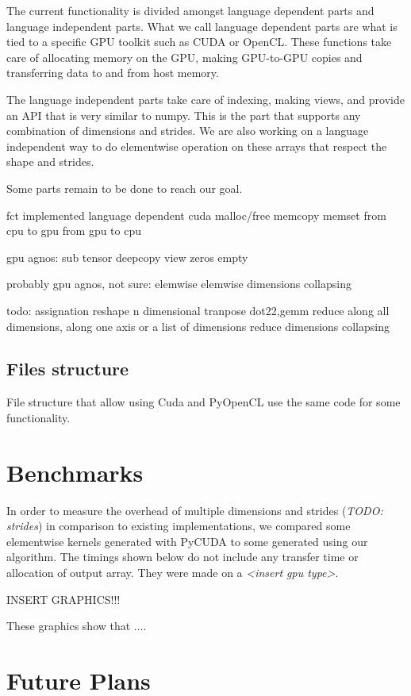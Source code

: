 \documentclass{article} %
\begin{document}
The current functionality is divided amongst language dependent parts and language independent parts.  What we call language dependent parts are what is tied to a specific GPU toolkit such as CUDA or OpenCL.  These functions take care of allocating memory on the GPU, making GPU-to-GPU copies and transferring data to and from host memory.  

The language independent parts take care of indexing, making views, and provide an API that is very similar to numpy.  This is the part that supports any combination of dimensions and strides.  We are also working on a language independent way to do elementwise operation on these arrays that respect the shape and strides.

Some parts remain to be done to reach our goal.

fct implemented language dependent
cuda
malloc/free
memcopy
memset
from cpu to gpu
from gpu to cpu

gpu agnos:
sub tensor
deepcopy
view
zeros
empty

probably gpu agnos, not sure:
elemwise
elemwise dimensions collapsing


todo:
assignation
reshape
n dimensional tranpose
dot22,gemm
reduce along all dimensions, along one axis or a list of dimensions
reduce dimensions collapsing

\subsection{Files structure}
File structure that allow using Cuda and PyOpenCL use the same code for some functionality.

\section{Benchmarks}

In order to measure the overhead of multiple dimensions and strides (\emph{TODO: strides}) in comparison to existing implementations, we compared some elementwise kernels generated with PyCUDA to some generated using our algorithm.  The timings shown below do not include any transfer time or allocation of output array.  They were made on a \emph{<insert gpu type>}.

INSERT GRAPHICS!!!

These graphics show that ....

\section{Future Plans}
\end{document}
